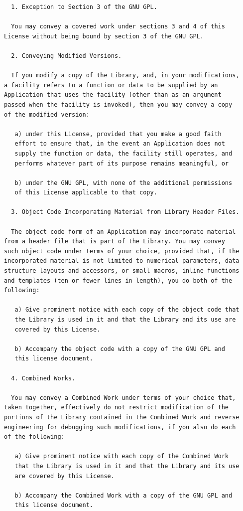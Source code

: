 \documentclass[11pt,twoside,fleqn,openright,titlepage]{cslreport}
\begin{document}
\begin{small}
\begin{verbatim}
  1. Exception to Section 3 of the GNU GPL.

  You may convey a covered work under sections 3 and 4 of this 
License without being bound by section 3 of the GNU GPL.

  2. Conveying Modified Versions.

  If you modify a copy of the Library, and, in your modifications,
a facility refers to a function or data to be supplied by an
Application that uses the facility (other than as an argument 
passed when the facility is invoked), then you may convey a copy
of the modified version:

   a) under this License, provided that you make a good faith 
   effort to ensure that, in the event an Application does not 
   supply the function or data, the facility still operates, and
   performs whatever part of its purpose remains meaningful, or

   b) under the GNU GPL, with none of the additional permissions 
   of this License applicable to that copy.

  3. Object Code Incorporating Material from Library Header Files.

  The object code form of an Application may incorporate material
from a header file that is part of the Library. You may convey 
such object code under terms of your choice, provided that, if the 
incorporated material is not limited to numerical parameters, data
structure layouts and accessors, or small macros, inline functions 
and templates (ten or fewer lines in length), you do both of the 
following:

   a) Give prominent notice with each copy of the object code that
   the Library is used in it and that the Library and its use are
   covered by this License.

   b) Accompany the object code with a copy of the GNU GPL and
   this license document.

  4. Combined Works.

  You may convey a Combined Work under terms of your choice that,
taken together, effectively do not restrict modification of the
portions of the Library contained in the Combined Work and reverse
engineering for debugging such modifications, if you also do each 
of the following:

   a) Give prominent notice with each copy of the Combined Work
   that the Library is used in it and that the Library and its use
   are covered by this License.

   b) Accompany the Combined Work with a copy of the GNU GPL and
   this license document.


\end{verbatim}
\end{small}
\end{document}
